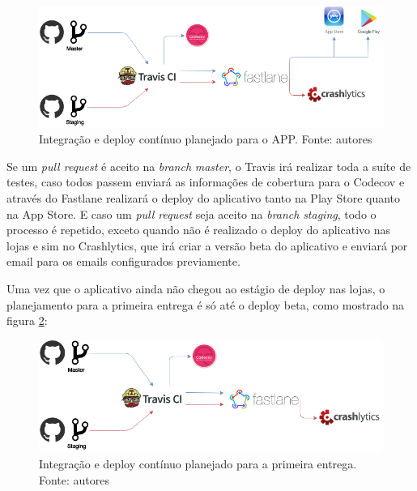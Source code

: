 \begin{figure}[H]
    \centering
    \includegraphics[scale=0.5]{figuras/ci_should_be.png}
    \caption[Integração e deploy contínuo planejado para o APP]{Integração e deploy contínuo planejado para o APP. Fonte: autores}
    \label{img:integracao_deploy_continuo_planejado_app}
\end{figure}

Se um \textit{pull request} é aceito na \textit{branch} \textit{master}, o Travis irá realizar toda a suíte de testes, caso todos passem enviará as informações de cobertura para o
Codecov e através do Fastlane realizará o deploy do aplicativo tanto na Play Store quanto na App Store. E caso um \textit{pull request} seja aceito na \textit{branch} \textit{staging}, todo o processo é repetido, exceto quando não é realizado o deploy do aplicativo nas lojas e sim no Crashlytics, que irá criar a versão beta do aplicativo e enviará por email para os emails configurados previamente.

Uma vez que o aplicativo ainda não chegou ao estágio de deploy nas lojas, o planejamento para a primeira entrega é só até o deploy beta, como mostrado na figura \ref{img:integracao_deploy_continuo_planejado_primeira_entrega}:

\begin{figure}[H]
    \centering
    \includegraphics[scale=0.5]{figuras/ci_as_is.png}
    \caption[Integração e deploy contínuo planejado para a primeira entrega]{Integração e deploy contínuo planejado para a primeira entrega. Fonte: autores}
    \label{img:integracao_deploy_continuo_planejado_primeira_entrega}
\end{figure}

